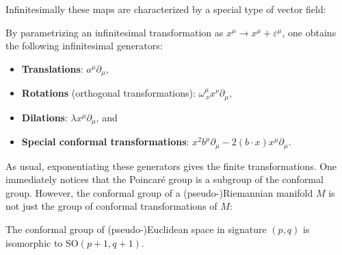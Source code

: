     Infinitesimally these maps are characterized by a special type of vector field:

    By parametrizing an infinitesimal transformation as $x^\mu\rightarrow x^\mu+\varepsilon^\mu$, one obtains the following infinitesimal generators:
    \begin{itemize}
        \item \textbf{Translations}: $a^\mu\partial_\mu$,
        \item \textbf{Rotations} (orthogonal transformations): $\omega^\mu_{\ \nu} x^\nu\partial_\mu$,
        \item \textbf{Dilations}: $\lambda x^\mu\partial_\mu$, and
        \item \textbf{Special conformal transformations}: $x^2b^\mu\partial_\mu - 2(b\cdot x)x^\mu\partial_\mu$.
    \end{itemize}
    As usual, exponentiating these generators gives the finite transformations. One immediately notices that the Poincar\'e group is a subgroup of the conformal group. However, the conformal group of a (pseudo-)Riemannian manifold $M$ is not just the group of conformal transformations of $M$:
    \begin{property}
        The conformal group of (pseudo-)Euclidean space in signature $(p,q)$ is isomorphic to $\text{SO}(p+1,q+1)$.
    \end{property}

